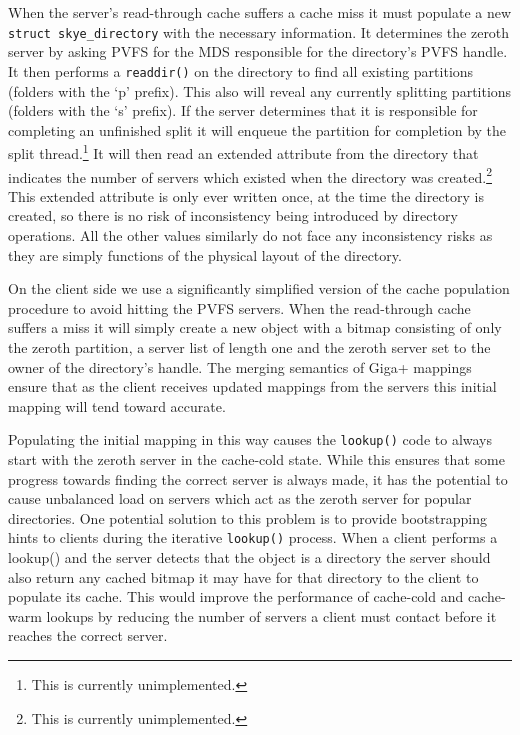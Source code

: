 \documentclass[letterpaper]{article}
\newcommand{\code}[1]{\texttt{#1}}
\begin{document}
When the server's read-through cache suffers a cache miss it must populate a new
\code{struct skye\_\-directory} with the necessary information.  It determines
the zeroth server by asking PVFS for the MDS responsible for the directory's
PVFS handle.  It then performs a \code{readdir()} on the directory to find all
existing partitions (folders with the `p' prefix).  This also will reveal any
currently splitting partitions (folders with the `s' prefix).  If the server
determines that it is responsible for completing an unfinished split it will
enqueue the partition for completion by the split thread.\footnote{This is
currently unimplemented.} It will then read an extended attribute from the
directory that indicates the number of servers which existed when the
directory was created.\footnote{This is currently unimplemented.}  This
extended attribute is only ever written once, at the time the directory is
created, so there is no risk of inconsistency being introduced by directory
operations.  All the other values similarly do not face any inconsistency
risks as they are simply functions of the physical layout of the directory.

On the client side we use a significantly simplified version of the cache
population procedure to avoid hitting the PVFS servers.  When the read-through
cache suffers a miss it will simply create a new object with a bitmap consisting
of only the zeroth partition, a server list of length one and the zeroth server
set to the owner of the directory's handle.  The merging semantics of Giga+
mappings ensure that as the client receives updated mappings from the servers
this initial mapping will tend toward accurate.

Populating the initial mapping in this way causes the \code{lookup()} code to always
start with the zeroth server in the cache-cold state.  While this ensures that
some progress towards finding the correct server is always made, it has the
potential to cause unbalanced load on servers which act as the zeroth server for
popular directories.  One potential solution to this problem is to provide
bootstrapping hints to clients during the iterative \code{lookup()} process.
When a client performs a {lookup()} and the server detects that the object is
a directory the server should also return any cached bitmap it may have for
that directory to the client to populate its cache.  This would improve the
performance of cache-cold and cache-warm lookups by reducing the number of
servers a client must contact before it reaches the correct server. 
\end{document}
